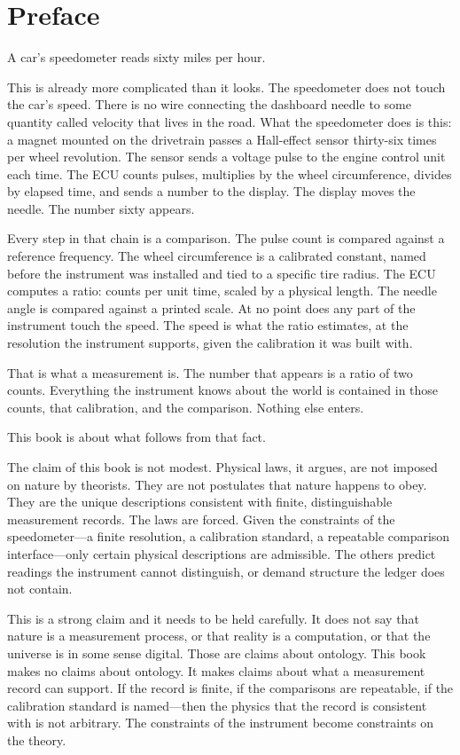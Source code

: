 \chapter*{Preface}
\label{chap:preface}

A car's speedometer reads sixty miles per hour.

This is already more complicated than it looks. The speedometer does not touch
the car's speed. There is no wire connecting the dashboard needle to some
quantity called velocity that lives in the road. What the speedometer does is
this: a magnet mounted on the drivetrain passes a Hall-effect sensor thirty-six
times per wheel revolution. The sensor sends a voltage pulse to the engine
control unit each time. The ECU counts pulses, multiplies by the wheel
circumference, divides by elapsed time, and sends a number to the display. The
display moves the needle. The number sixty appears.

Every step in that chain is a comparison. The pulse count is compared against
a reference frequency. The wheel circumference is a calibrated constant, named
before the instrument was installed and tied to a specific tire radius. The ECU
computes a ratio: counts per unit time, scaled by a physical length. The needle
angle is compared against a printed scale. At no point does any part of the
instrument touch the speed. The speed is what the ratio estimates, at the
resolution the instrument supports, given the calibration it was built with.

That is what a measurement is. The number that appears is a ratio of two counts.
Everything the instrument knows about the world is contained in those counts,
that calibration, and the comparison. Nothing else enters.

This book is about what follows from that fact.

\bigskip

The claim of this book is not modest. Physical laws, it argues, are not
imposed on nature by theorists. They are not postulates that nature happens to
obey. They are the unique descriptions consistent with finite, distinguishable
measurement records. The laws are forced. Given the constraints of the
speedometer---a finite resolution, a calibration standard, a repeatable
comparison interface---only certain physical descriptions are admissible. The
others predict readings the instrument cannot distinguish, or demand structure
the ledger does not contain.

This is a strong claim and it needs to be held carefully. It does not say that
nature is a measurement process, or that reality is a computation, or that the
universe is in some sense digital. Those are claims about ontology. This book
makes no claims about ontology. It makes claims about what a measurement record
can support. If the record is finite, if the comparisons are repeatable, if the
calibration standard is named---then the physics that the record is consistent
with is not arbitrary. The constraints of the instrument become constraints on
the theory.

